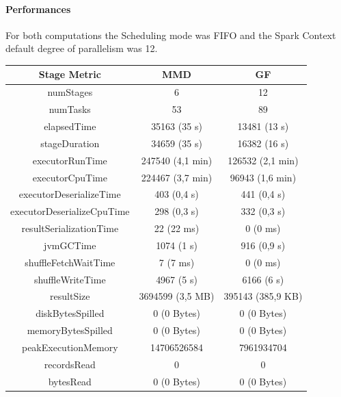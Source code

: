 \documentclass[a4paper,11pt, twoside]{article}
\begin{document}
            \paragraph{Performances}
            For both computations the Scheduling mode was FIFO and the Spark Context default degree of parallelism was 12.
            \begin{table}[h!]
                    \centering
                \small
                \begin{tabular}{ccc}
                    \toprule
                      \textbf{Stage Metric} & \textbf{MMD} & \textbf{GF} \\
                    \midrule
                        numStages & 6 & 12 \\
                        numTasks & 53 & 89 \\
                        elapsedTime & 35163 (35 s) & 13481 (13 s) \\
                        stageDuration & 34659 (35 s) & 16382 (16 s) \\
                        executorRunTime & 247540 (4,1 min) & 126532 (2,1 min) \\
                        executorCpuTime & 224467 (3,7 min) & 96943 (1,6 min) \\
                        executorDeserializeTime & 403 (0,4 s) & 441 (0,4 s) \\
                        executorDeserializeCpuTime & 298 (0,3 s) & 332 (0,3 s) \\
                        resultSerializationTime & 22 (22 ms) & 0 (0 ms) \\
                        jvmGCTime & 1074 (1 s) & 916 (0,9 s) \\
                        shuffleFetchWaitTime & 7 (7 ms) & 0 (0 ms) \\
                        shuffleWriteTime & 4967 (5 s) & 6166 (6 s) \\
                        resultSize & 3694599 (3,5 MB) & 395143 (385,9 KB) \\
                        diskBytesSpilled & 0 (0 Bytes) & 0 (0 Bytes) \\
                        memoryBytesSpilled & 0 (0 Bytes) & 0 (0 Bytes) \\
                        peakExecutionMemory & 14706526584 & 7961934704 \\
                        recordsRead & 0 & 0 \\
                        bytesRead & 0 (0 Bytes) & 0 (0 Bytes) \\

\end{tabular}
\end{table}
\end{document}
